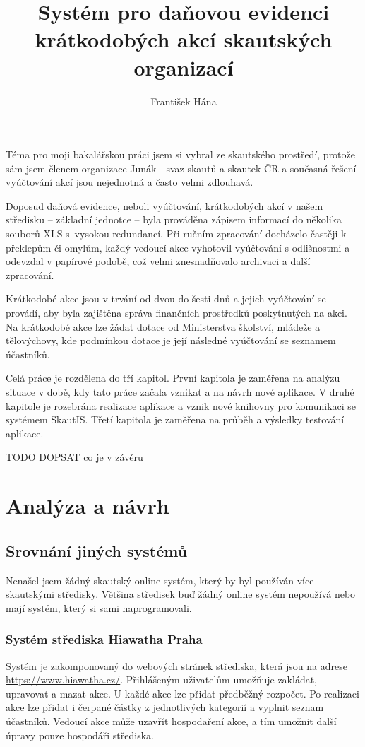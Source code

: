 \documentclass[thesis=B,czech]{FITthesis}[2011/06/14]
\title{Systém pro daňovou evidenci krátkodobých akcí skautských organizací}
\author{František Hána} %
\begin{document}

\begin{introduction}
Téma pro moji bakalářskou práci jsem si vybral ze skautského prostředí, protože sám jsem členem organizace Junák - svaz skautů a skautek ČR a současná řešení vyúčtování akcí jsou nejednotná a často velmi zdlouhavá.

Doposud daňová evidence, neboli vyúčtování, krátkodobých akcí v našem středisku -- základní jednotce -- byla prováděna zápisem informací do několika souborů XLS s~vysokou redundancí. Při ručním zpracování docházelo častěji k překlepům či omylům, každý vedoucí akce vyhotovil vyúčtování s odlišnostmi a odevzdal v papírové podobě, což velmi znesnadňovalo archivaci a další zpracování. 

Krátkodobé akce jsou v trvání od dvou do šesti dnů a jejich vyúčtování se provádí, aby byla zajištěna správa finančních prostředků poskytnutých na akci. Na krátkodobé akce lze žádat dotace od Ministerstva školství, mládeže a tělovýchovy, kde podmínkou dotace je její následné vyúčtování se seznamem účastníků.

Celá práce je rozdělena do tří kapitol. První kapitola je zaměřena na analýzu situace v době, kdy tato práce začala vznikat a na návrh nové aplikace. V druhé kapitole je rozebrána realizace aplikace a vznik nové knihovny pro komunikaci se systémem SkautIS. Třetí kapitola je zaměřena na průběh a výsledky testování aplikace. 



TODO DOPSAT co je v závěru 




\end{introduction}

\chapter{Analýza a návrh}
\section{Srovnání jiných systémů}
Nenašel jsem žádný skautský online systém, který by byl používán více skautskými středisky. Většina středisek buď žádný online systém nepoužívá nebo mají systém, který si sami naprogramovali.

\subsection{Systém střediska Hiawatha Praha}
Systém je zakomponovaný do webových stránek střediska, která jsou na adrese \url{https://www.hiawatha.cz/}. Přihlášeným uživatelům umožňuje zakládat, upravovat a mazat akce. U každé akce lze přidat předběžný rozpočet. Po realizaci akce lze přidat i čerpané částky z jednotlivých kategorií a vyplnit seznam účastníků. Vedoucí akce může uzavřít hospodaření akce, a tím umožnit další úpravy pouze hospodáři střediska.
\end{document}
